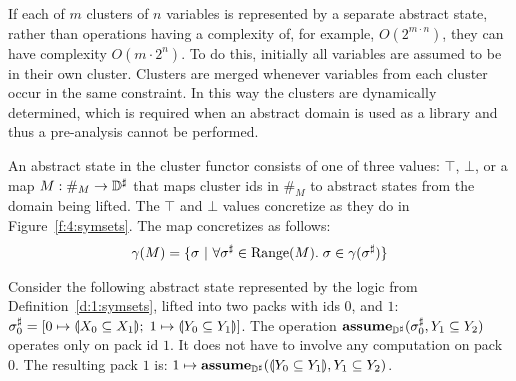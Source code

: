 If each of $m$ clusters of $n$ variables is represented by a separate abstract state, rather than operations having a complexity of, for example, $O(2^{m\cdot n})$, they can have complexity $O(m\cdot 2^n)$.  To do this, initially all variables are assumed to be in their own cluster.  Clusters are merged whenever variables from each cluster occur in the same constraint.  In this way the clusters are dynamically determined, which is required when an abstract domain is used as a library and thus a pre-analysis cannot be performed.

An abstract state in the cluster functor consists of one of three values: $\top$, $\bot$, or a map $M : \#_M \rightarrow {\mathbb{D}}^{\sharp}$ that maps cluster ids in $\#_M$ to abstract states from the domain being lifted.  The $\top$ and $\bot$ values concretize as they do in Figure~\ref{f:4:symsets}.  The map concretizes as follows:
\begin{align*}
  \gamma(M) = \{ \sigma \ | \ \forall {\sigma}^{\sharp} \in \textrm{Range}(M). \; \sigma \in \gamma({\sigma}^{\sharp}) \}
\end{align*}

\begin{example}
Consider the following abstract state represented by the logic from Definition~\ref{d:1:symsets}, lifted into two packs with ids $0$, and $1$:
$
  {\sigma}^{\sharp}_0 = [0 \mapsto \llparenthesis X_0 \subseteq X_1 \rrparenthesis; \; 1 \mapsto \llparenthesis Y_0 \subseteq Y_1 \rrparenthesis ]
$.
The operation $\textbf{assume}_{{\mathbb{D}}^{\sharp}}({\sigma}^{\sharp}_0, Y_1 \subseteq Y_2)$ operates only on pack id $1$.  It does not have to involve any computation on pack $0$.  The resulting pack $1$ is: $1 \mapsto \textbf{assume}_{{\mathbb{D}}^{\sharp}}(\llparenthesis Y_0 \subseteq Y_1 \rrparenthesis, Y_1 \subseteq Y_2)$.
\end{example}
